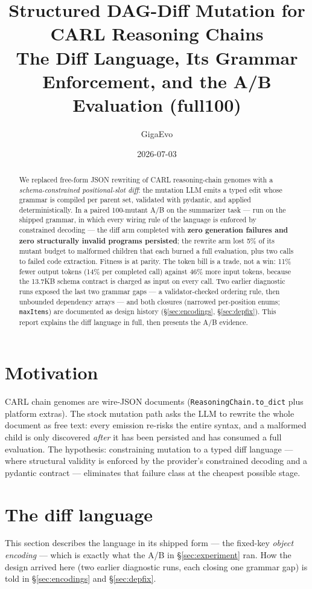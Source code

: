 \documentclass[11pt]{article}
\title{\color{accent}\bfseries Structured DAG-Diff Mutation for CARL Reasoning Chains\\
\large The Diff Language, Its Grammar Enforcement, and the A/B Evaluation (full100)}
\author{GigaEvo}
\date{2026-07-03}
\begin{document}
\maketitle

\begin{abstract}
\noindent
We replaced free-form JSON rewriting of CARL reasoning-chain genomes with a
\emph{schema-constrained positional-slot diff}: the mutation LLM emits a typed edit whose
grammar is compiled per parent set, validated with pydantic, and applied deterministically.
In a paired 100-mutant A/B on the summarizer task --- run on the shipped grammar, in which
every wiring rule of the language is enforced by constrained decoding --- the diff arm
completed with \textbf{zero generation failures and zero structurally invalid programs
persisted}; the rewrite arm lost 5\% of its mutant budget to malformed children that each
burned a full evaluation, plus two calls to failed code extraction. Fitness is at parity.
The token bill is a trade, not a win: 11\% fewer output tokens (14\% per completed call)
against 46\% more input tokens, because the 13.7KB schema contract is charged as input on
every call. Two earlier diagnostic runs exposed the last two grammar gaps --- a
validator-checked ordering rule, then unbounded dependency arrays --- and both closures
(narrowed per-position enums; \texttt{maxItems}) are documented as design history
(\S\ref{sec:encodings}, \S\ref{sec:depfix}). This report explains the diff language in
full, then presents the A/B evidence.
\end{abstract}

\section{Motivation}
CARL chain genomes are wire-JSON documents (\texttt{ReasoningChain.to\_dict} plus platform
extras). The stock mutation path asks the LLM to rewrite the whole document as free text:
every emission re-risks the entire syntax, and a malformed child is only discovered
\emph{after} it has been persisted and has consumed a full evaluation. The hypothesis:
constraining mutation to a typed diff language --- where structural validity is enforced by
the provider's constrained decoding and a pydantic contract --- eliminates that failure class
at the cheapest possible stage.

\section{The diff language}
\label{sec:language}
This section describes the language in its shipped form --- the fixed-key \emph{object
encoding} --- which is exactly what the A/B in \S\ref{sec:experiment} ran. How the design
arrived here (two earlier diagnostic runs, each closing one grammar gap) is told in
\S\ref{sec:encodings} and \S\ref{sec:depfix}.
\end{document}
